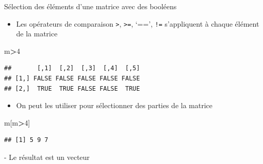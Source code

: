 \documentclass[
  ignorenonframetext,
]{beamer}
\newenvironment{Shaded}{\begin{snugshade}}{\end{snugshade}}
\newcommand{\DecValTok}[1]{\textcolor[rgb]{0.00,0.00,0.81}{#1}}
\newcommand{\NormalTok}[1]{#1}
\newcommand{\SpecialCharTok}[1]{\textcolor[rgb]{0.81,0.36,0.00}{\textbf{#1}}}
\providecommand{\tightlist}{%
  \setlength{\itemsep}{0pt}\setlength{\parskip}{0pt}}
\begin{document}
\begin{frame}[fragile]{Sélection des éléments d'une matrice avec des
booléens}
\protect\hypertarget{suxe9lection-des-uxe9luxe9ments-dune-matrice-avec-des-booluxe9ens}{}
\begin{itemize}
\tightlist
\item
  Les opérateurs de comparaison \texttt{\textgreater{}},
  \texttt{\textgreater{}=}, `==', \texttt{!=} s'appliquent à chaque
  élément de la matrice
\end{itemize}

\tiny

\begin{Shaded}
\begin{Highlighting}[]
\NormalTok{m}\SpecialCharTok{\textgreater{}}\DecValTok{4}
\end{Highlighting}
\end{Shaded}

\begin{verbatim}
##       [,1]  [,2]  [,3]  [,4]  [,5]
## [1,] FALSE FALSE FALSE FALSE FALSE
## [2,]  TRUE  TRUE FALSE FALSE  TRUE
\end{verbatim}

\normalsize

\begin{itemize}
\tightlist
\item
  On peut les utiliser pour sélectionner des parties de la matrice
\end{itemize}

\tiny

\begin{Shaded}
\begin{Highlighting}[]
\NormalTok{m[m}\SpecialCharTok{\textgreater{}}\DecValTok{4}\NormalTok{]}
\end{Highlighting}
\end{Shaded}

\begin{verbatim}
## [1] 5 9 7
\end{verbatim}

\normalsize - Le résultat est un vecteur
\end{frame}
\end{document}
